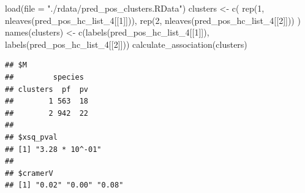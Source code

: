 \documentclass[
  11pt,
  oneside]{book}
\newenvironment{Shaded}{\begin{snugshade}}{\end{snugshade}}
\newcommand{\AttributeTok}[1]{\textcolor[rgb]{0.77,0.63,0.00}{#1}}
\newcommand{\DecValTok}[1]{\textcolor[rgb]{0.00,0.00,0.81}{#1}}
\newcommand{\FunctionTok}[1]{\textcolor[rgb]{0.00,0.00,0.00}{#1}}
\newcommand{\NormalTok}[1]{#1}
\newcommand{\OtherTok}[1]{\textcolor[rgb]{0.56,0.35,0.01}{#1}}
\newcommand{\StringTok}[1]{\textcolor[rgb]{0.31,0.60,0.02}{#1}}
\begin{document}
\begin{Shaded}
\begin{Highlighting}[]
\FunctionTok{load}\NormalTok{(}\AttributeTok{file =} \StringTok{"./rdata/pred\_pos\_clusters.RData"}\NormalTok{)}
\NormalTok{clusters }\OtherTok{\textless{}{-}} \FunctionTok{c}\NormalTok{(}
  \FunctionTok{rep}\NormalTok{(}\DecValTok{1}\NormalTok{, }\FunctionTok{nleaves}\NormalTok{(pred\_pos\_hc\_list\_4[[}\DecValTok{1}\NormalTok{]])),}
  \FunctionTok{rep}\NormalTok{(}\DecValTok{2}\NormalTok{, }\FunctionTok{nleaves}\NormalTok{(pred\_pos\_hc\_list\_4[[}\DecValTok{2}\NormalTok{]]))}
\NormalTok{)}
\FunctionTok{names}\NormalTok{(clusters) }\OtherTok{\textless{}{-}} \FunctionTok{c}\NormalTok{(}\FunctionTok{labels}\NormalTok{(pred\_pos\_hc\_list\_4[[}\DecValTok{1}\NormalTok{]]), }\FunctionTok{labels}\NormalTok{(pred\_pos\_hc\_list\_4[[}\DecValTok{2}\NormalTok{]]))}
\FunctionTok{calculate\_association}\NormalTok{(clusters)}
\end{Highlighting}
\end{Shaded}

\begin{verbatim}
## $M
##         species
## clusters  pf  pv
##        1 563  18
##        2 942  22
## 
## $xsq_pval
## [1] "3.28 * 10^-01"
## 
## $cramerV
## [1] "0.02" "0.00" "0.08"
\end{verbatim}
\end{document}
